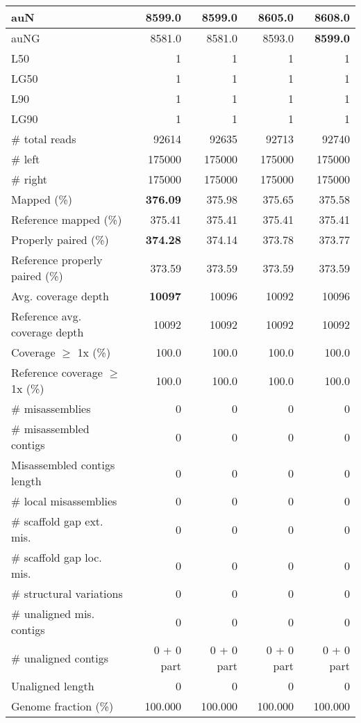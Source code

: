 \documentclass[12pt,a4paper]{article}
\begin{document}
\begin{table}[ht]
\begin{center}
\begin{tabular}{|l*{4}{|r}|}
auN & 8599.0 & 8599.0 & 8605.0 & {\bf 8608.0} \\ \hline
auNG & 8581.0 & 8581.0 & 8593.0 & {\bf 8599.0} \\ \hline
L50 & 1 & 1 & 1 & 1 \\ \hline
LG50 & 1 & 1 & 1 & 1 \\ \hline
L90 & 1 & 1 & 1 & 1 \\ \hline
LG90 & 1 & 1 & 1 & 1 \\ \hline
\# total reads & 92614 & 92635 & 92713 & 92740 \\ \hline
\# left & 175000 & 175000 & 175000 & 175000 \\ \hline
\# right & 175000 & 175000 & 175000 & 175000 \\ \hline
Mapped (\%) & {\bf 376.09} & 375.98 & 375.65 & 375.58 \\ \hline
Reference mapped (\%) & 375.41 & 375.41 & 375.41 & 375.41 \\ \hline
Properly paired (\%) & {\bf 374.28} & 374.14 & 373.78 & 373.77 \\ \hline
Reference properly paired (\%) & 373.59 & 373.59 & 373.59 & 373.59 \\ \hline
Avg. coverage depth & {\bf 10097} & 10096 & 10092 & 10096 \\ \hline
Reference avg. coverage depth & 10092 & 10092 & 10092 & 10092 \\ \hline
Coverage $\geq$ 1x (\%) & 100.0 & 100.0 & 100.0 & 100.0 \\ \hline
Reference coverage $\geq$ 1x (\%) & 100.0 & 100.0 & 100.0 & 100.0 \\ \hline
\# misassemblies & 0 & 0 & 0 & 0 \\ \hline
\# misassembled contigs & 0 & 0 & 0 & 0 \\ \hline
Misassembled contigs length & 0 & 0 & 0 & 0 \\ \hline
\# local misassemblies & 0 & 0 & 0 & 0 \\ \hline
\# scaffold gap ext. mis. & 0 & 0 & 0 & 0 \\ \hline
\# scaffold gap loc. mis. & 0 & 0 & 0 & 0 \\ \hline
\# structural variations & 0 & 0 & 0 & 0 \\ \hline
\# unaligned mis. contigs & 0 & 0 & 0 & 0 \\ \hline
\# unaligned contigs & 0 + 0 part & 0 + 0 part & 0 + 0 part & 0 + 0 part \\ \hline
Unaligned length & 0 & 0 & 0 & 0 \\ \hline
Genome fraction (\%) & 100.000 & 100.000 & 100.000 & 100.000 \\ \hline

\end{tabular}
\end{center}
\end{table}
\end{document}
